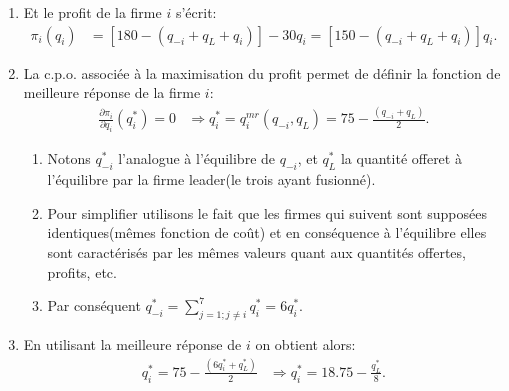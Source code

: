 \documentclass[notes, ignorenonframetext, compress, 10pt, xcolor=svgnames, aspectratio=169]{beamer}
\begin{document}
\begin{frame}[allowframebreaks]{\insertsection}
\begin{enumerate}[$\star$]
            \item Et le profit de la firme $i$ s'écrit:
            \begin{align*}
                \pi_i(q_i) &= \left[180 - (q_{-i} + q_L + q_i ) \right] - 30q_i = \left[150 - ( q_{-i} + q_L + q_i )\right]q_i.
            \end{align*}
            \item La c.p.o. associée à la maximisation du profit permet de définir la fonction
            de meilleure réponse de la firme $i$:
            \begin{align*}
             \frac{\partial \pi_i}{\partial q_i}(q_i^{*}) = 0 &\Rightarrow 
             q_i^{*} = q_i^{mr}(q_{-i}, q_L) = 75 - \frac{(q_{-i} + q_L)}{2}.
             \end{align*}
             \begin{enumerate}[$\star$]
                \item Notons $q_{-i}^{*}$ l'analogue à l'équilibre de $q_{-i}$, et $q_L^*$ la quantité offeret
               à l'équilibre par la firme leader(le trois ayant fusionné). 
               \item Pour simplifier utilisons le fait que les firmes qui suivent 
               sont supposées identiques(mêmes fonction de coût) et en conséquence 
               à l'équilibre elles sont caractérisés par les mêmes valeurs quant aux quantités offertes, profits, etc.  
               \item Par conséquent $q_{-i}^{*} = \sum_{j=1; j\neq i}^7 q_i^* = 6q_i^*$.
              \end{enumerate}
              \item En utilisant la meilleure réponse de $i$ on obtient alors:
              \begin{align*}
                  q_i^{*}= 75 - \frac{(6q_i^* + q_L^*)}{2} &\Rightarrow q_i^* = 18.75 -\frac{q_L^*}{8}.
                  \end{align*}


\end{enumerate}
\end{frame}
\end{document}
